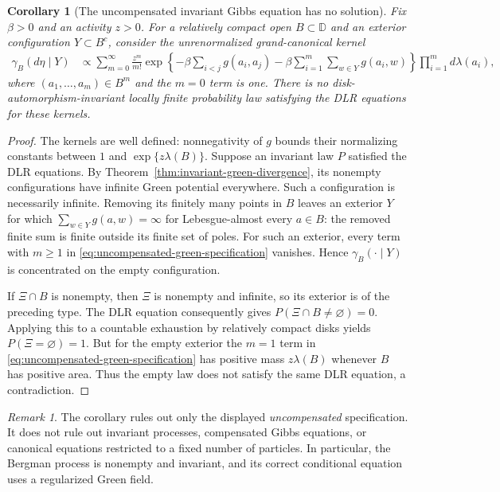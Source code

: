 \documentclass[11pt,a4paper]{article}
\numberwithin{equation}{section}
\newtheorem{corollary}[theorem]{Corollary}
\theoremstyle{definition}
\theoremstyle{remark}
\newtheorem{remark}[theorem]{Remark}
\begin{document}
\begin{corollary}[The uncompensated invariant Gibbs equation has no solution]
\label{cor:uncompensated-green-dlr-impossible}
Fix $\beta>0$ and an activity $z>0$. For a relatively compact open
$B\subset\mathbb D$ and an exterior configuration $Y\subset B^c$,
consider the unrenormalized grand-canonical kernel
\begin{align}
 \gamma_B(d\eta\mid Y)
 &\propto\sum_{m=0}^\infty\frac{z^m}{m!}
   \exp\left\{-\beta\sum_{i<j}g(a_i,a_j)
       -\beta\sum_{i=1}^m\sum_{w\in Y}g(a_i,w)\right\}
   \prod_{i=1}^m d\lambda(a_i),
 \label{eq:uncompensated-green-specification}
\end{align}
where $(a_1,\ldots,a_m)\in B^m$ and the $m=0$ term is one.
There is no disk-automorphism-invariant locally finite probability law
satisfying the DLR equations for these kernels.
\end{corollary}

\begin{proof}
The kernels are well defined: nonnegativity of $g$ bounds their
normalizing constants between $1$ and $\exp\{z\lambda(B)\}$.
Suppose an invariant law $P$ satisfied the DLR equations. By
Theorem~\ref{thm:invariant-green-divergence}, its nonempty configurations
have infinite Green potential everywhere. Such a configuration is
necessarily infinite. Removing its finitely many points in $B$ leaves
an exterior $Y$ for which
$\sum_{w\in Y}g(a,w)=\infty$ for Lebesgue-almost every $a\in B$:
the removed finite sum is finite outside its finite set of poles.
For such an exterior, every term with $m\ge1$ in
\eqref{eq:uncompensated-green-specification} vanishes. Hence
$\gamma_B(\cdot\mid Y)$ is concentrated on the empty configuration.

If $\Xi\cap B$ is nonempty, then $\Xi$ is nonempty and infinite, so
its exterior is of the preceding type. The DLR equation consequently
gives $P(\Xi\cap B\ne\varnothing)=0$. Applying this to a countable
exhaustion by relatively compact disks yields $P(\Xi=\varnothing)=1$.
But for the empty exterior the $m=1$ term in
\eqref{eq:uncompensated-green-specification} has positive mass
$z\lambda(B)$ whenever $B$ has positive area. Thus the empty law does
not satisfy the same DLR equation, a contradiction.
\end{proof}

\begin{remark}
The corollary rules out only the displayed \emph{uncompensated}
specification. It does not rule out invariant processes, compensated
Gibbs equations, or canonical equations restricted to a fixed number
of particles. In particular, the Bergman process is nonempty and
invariant, and its correct conditional equation uses a regularized
Green field.
\end{remark}
\end{document}
